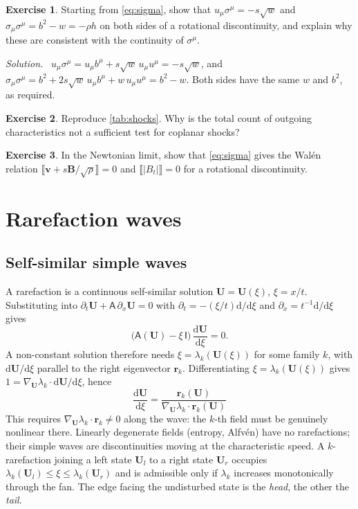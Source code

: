 \documentclass[11pt,a4paper,oneside,openany]{book}
\theoremstyle{definition}
\newtheorem{exercise}{Exercise}[chapter]
\theoremstyle{plain}
\theoremstyle{remark}
\newenvironment{solution}{\par\smallskip\noindent\small\textit{Solution.}\ }{\par\medskip}
\newcommand{\jump}[1]{\llbracket #1\rrbracket}
\newcommand{\dd}{\mathrm{d}}
\newcommand{\vv}{\bm{v}}
\newcommand{\BB}{\bm{B}}
\newcommand{\UU}{\bm{U}}
\begin{document}
\begin{exercise}
Starting from \eqref{eq:sigma}, show that $u_\mu\sigma^\mu=-s\sqrt w$ and
$\sigma_\mu\sigma^\mu=b^2-w=-\rho h$ on both sides of a rotational discontinuity, and
explain why these are consistent with the continuity of $\sigma^\mu$.
\end{exercise}
\begin{solution}
$u_\mu\sigma^\mu=u_\mu b^\mu+s\sqrt w\,u_\mu u^\mu=-s\sqrt w$, and
$\sigma_\mu\sigma^\mu=b^2+2s\sqrt w\,u_\mu b^\mu+w\,u_\mu u^\mu=b^2-w$. Both sides have
the same $w$ and $b^2$, as required.
\end{solution}

\begin{exercise}
Reproduce \cref{tab:shocks}. Why is the total count of outgoing characteristics not a
sufficient test for coplanar shocks?
\end{exercise}

\begin{exercise}
In the Newtonian limit, show that \eqref{eq:sigma} gives the Walén relation
$\jump{\vv+s\BB/\sqrt{\rho}}=0$ and $\jump{|B_t|}=0$ for a rotational discontinuity.
\end{exercise}


\chapter{Rarefaction waves}\label{ch:rarefactions}

\section{Self-similar simple waves}

A rarefaction is a continuous self-similar solution $\UU=\UU(\xi)$, $\xi=x/t$. Substituting
into $\partial_t\UU+\mathsf A\,\partial_x\UU=0$ with $\partial_t=-(\xi/t)\dd/\dd\xi$ and
$\partial_x=t^{-1}\dd/\dd\xi$ gives
\begin{equation}\label{eq:simplewave}
\bigl(\mathsf A(\UU)-\xi\,\mathsf I\bigr)\,\frac{\dd\UU}{\dd\xi}=0 .
\end{equation}
A non-constant solution therefore needs $\xi=\lambda_k(\UU(\xi))$ for some family $k$, with
$\dd\UU/\dd\xi$ parallel to the right eigenvector $\bm r_k$. Differentiating
$\xi=\lambda_k(\UU(\xi))$ gives $1=\nabla_{\UU}\lambda_k\cdot\dd\UU/\dd\xi$, hence
\begin{equation}\label{eq:fanode}
\boxed{\;\frac{\dd\UU}{\dd\xi}=\frac{\bm r_k(\UU)}{\nabla_{\UU}\lambda_k\cdot\bm r_k(\UU)}\;}
\end{equation}
This requires $\nabla_{\UU}\lambda_k\cdot\bm r_k\ne0$ along the wave: the $k$-th field must
be genuinely nonlinear there. Linearly degenerate fields (entropy, Alfvén) have no
rarefactions; their simple waves are discontinuities moving at the characteristic
speed. A $k$-rarefaction joining a left state $\UU_l$ to a right state $\UU_r$ occupies
$\lambda_k(\UU_l)\le\xi\le\lambda_k(\UU_r)$ and is admissible only if $\lambda_k$
increases monotonically through the fan. The edge facing the undisturbed state is the
\emph{head}, the other the \emph{tail}.
\end{document}

